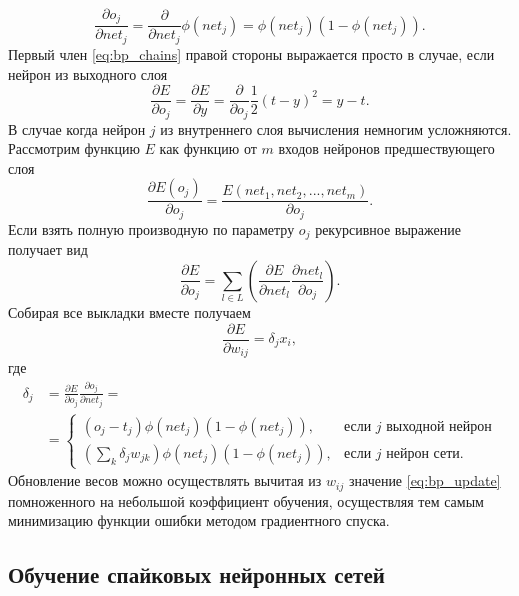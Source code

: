 \documentclass[a4paper,10pt]{article}
\begin{document}
\begin{equation}
\frac{{\partial o_{j}}}{\partial net_{j}} = \frac{\partial}{\partial net_{j}} \phi(net_{j}) = \phi(net_{j})(1-\phi(net_{j})).
\end{equation}
\indent Первый член \eqref{eq:bp_chains} правой стороны выражается просто в случае, если нейрон из выходного слоя
\begin{equation}
\frac{\partial E}{\partial o_{j}} = \frac{\partial E}{\partial y} = \frac{\partial}{\partial o_{j}} \frac{1}{2} (t-y)^2 = y - t  .
\end{equation}
\indent В случае когда нейрон $j$ из внутреннего слоя вычисления немногим усложняются. Рассмотрим функцию $E$ как функцию от $m$ входов нейронов предшествующего слоя
\begin{equation}
\frac{\partial E(o_{j})}{\partial o_{j}} = \frac{E(net_{1}, net_{2},...,net_{m})}{\partial o_{j}}.
\end{equation}
\indent Если взять полную производную по параметру $o_{j}$ рекурсивное выражение получает вид
\begin{equation}
\frac{\partial E}{\partial o_{j}} = \sum_{l\in L}\left(\frac{\partial E}{\partial net_{l}} \frac{\partial net_{l}}{\partial o_{j}}\right).
\end{equation}
\indent Собирая все выкладки вместе получаем
\begin{equation}\label{eq:bp_update}
\frac{\partial E}{\partial w_{ij}} = \delta_{j} x_{i},
\end{equation}
где
\begin{equation}
\begin{split}
\delta_{j} &= \frac{\partial E}{\partial o_{j}} \frac{\partial o_{j}}{\partial net_{j}} = \\ &=\begin{cases} (o_{j}-t_{j}) \phi(net_{j})(1-\phi(net_{j})), & \mbox{если }j\mbox{ выходной нейрон} \\ (\sum_{k}\delta_{j}w_{jk})\phi(net_{j})(1-\phi(net_{j})), & \mbox{если }j\mbox{ нейрон сети.} \end{cases}
\end{split}
\end{equation}
\indent Обновление весов можно осуществлять вычитая из $w_{ij}$ значение \eqref{eq:bp_update} помноженного на небольшой коэффициент обучения, осуществляя тем самым минимизацию функции ошибки методом градиентного спуска.
\subsection{Обучение спайковых нейронных сетей}
\end{document}
